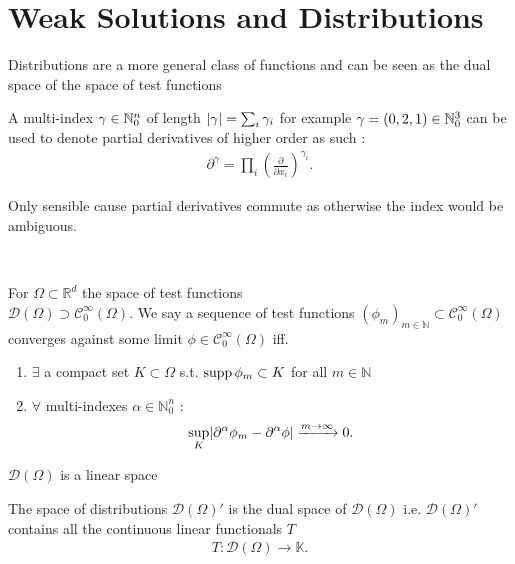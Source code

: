 \section{Weak Solutions and Distributions}
Distributions are a more general class of functions and can be seen as the dual space of the space of test functions 
\begin{definition}
A multi-index $\gamma \in \mathbb{N}_0^n$ of length $\lvert\gamma \rvert = \sum_{i} \gamma_i$
for example $\gamma  = (0,2,1) \in \mathbb{N}^3_0$  can be used to denote partial derivatives of higher order as such : 
\begin{align*}
  \partial^{\gamma } = \prod_i (\frac{\partial}{\partial x_i})^{\gamma_i}
.\end{align*}
\end{definition}
\begin{remark}
  Only sensible cause partial derivatives commute as otherwise the index would be ambiguous.
\end{remark}
\hspace{0mm}\\
\begin{definition}
 For $\Omega \subset  \mathbb{R}^{d} $  the space of test functions \\ $\mathcal{D}(\Omega) \supset \mathcal{C}_0^{\infty}(\Omega) $.
 We say a sequence of test functions $(\phi_m)_{m \in  \mathbb{N}} \subset \mathcal{C}_0^{\infty}(\Omega )$ converges against some limit $\phi \in  \mathcal{C}_0^{\infty}(\Omega ) $ iff.
 \begin{enumerate}
  \item $\exists $ a compact set $K \subset  \Omega $ s.t. $\operatorname*{supp} \phi_m \subset  K$ for all $m \in  \mathbb{N}$ 
  \item $\forall $ multi-indexes $\alpha \in  \mathbb{N}_0^{n}  $ :
    \begin{align*}
      \sup_{K} \lvert\partial^{\alpha} \phi_m - \partial ^{\alpha } \phi   \rvert \xrightarrow{m\to \infty} 0
    .\end{align*}
 \end{enumerate}
\end{definition}
\begin{remark}
  $\mathcal{D}(\Omega )$ is a linear space  
\end{remark}
\begin{definition}[Distribution]
  The space of distributions  $\mathcal{D}(\Omega)'$  is the dual space of $\mathcal{D}(\Omega )$ i.e. 
  $\mathcal{D}(\Omega )'$ contains all the continuous linear functionals $T$ 
  \begin{align*}
    T : \mathcal{D}(\Omega ) \to  \mathbb{K}
  .\end{align*}
\end{definition}
